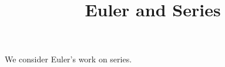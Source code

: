 \documentclass{ximera}
\title{Euler and Series}
\begin{document}
\begin{abstract}
\end{abstract}
\maketitle

We consider Euler's work on series.
\end{document}
